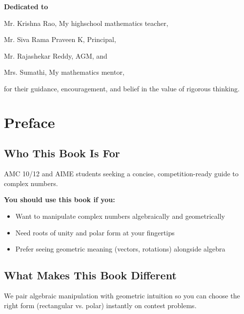 \documentclass[12pt]{extarticle}
\begin{document}
\thispagestyle{empty}
\vspace*{\fill}
\begin{center}
\Large

\textbf{Dedicated to}

\vspace{1cm}

Mr. Krishna Rao, My highschool mathematics teacher,

Mr. Siva Rama Praveen K, Principal,

Mr. Rajashekar Reddy, AGM, and

Mrs. Sumathi, My mathematics mentor,

\vspace{1cm}

for their guidance, encouragement, and belief in the value of rigorous thinking.
\end{center}
\vspace*{\fill}

\newpage

	\tableofcontents
\newpage

\section*{Preface}

\subsection*{Who This Book Is For}
AMC 10/12 and AIME students seeking a concise, competition-ready guide to complex numbers.

	\textbf{You should use this book if you:}
\begin{itemize}
  \item Want to manipulate complex numbers algebraically and geometrically
  \item Need roots of unity and polar form at your fingertips
  \item Prefer seeing geometric meaning (vectors, rotations) alongside algebra
\end{itemize}

\subsection*{What Makes This Book Different}
We pair algebraic manipulation with geometric intuition so you can choose the right form (rectangular vs. polar) instantly on contest problems.
\end{document}
